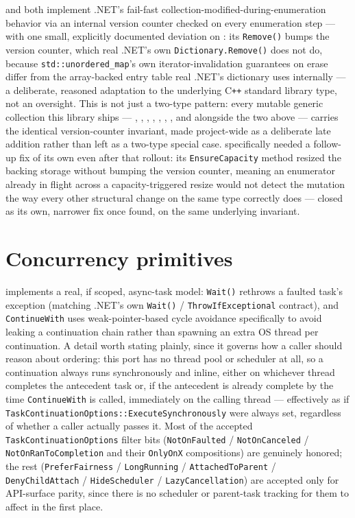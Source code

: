  and  both
implement .NET's fail-fast collection-modified-during-enumeration behavior via an internal
version counter checked on every enumeration step --- with one small, explicitly documented
deviation on : its \texttt{Remove()} bumps the version counter, which
real .NET's own \texttt{Dictionary.Remove()} does not do, because \texttt{std::unordered\_map}'s
own iterator-invalidation guarantees on erase differ from the array-backed entry table real
.NET's dictionary uses internally --- a deliberate, reasoned adaptation to the underlying
C\texttt{++} standard library type, not an oversight. This is not just a two-type pattern:
every mutable generic collection this library ships --- , ,
, , , ,
, and  alongside the two above --- carries the
identical version-counter invariant, made project-wide as a deliberate late addition rather
than left as a two-type special case.  specifically needed a
follow-up fix of its own even after that rollout: its \texttt{EnsureCapacity} method resized
the backing storage without bumping the version counter, meaning an enumerator already in
flight across a capacity-triggered resize would not detect the mutation the way every other
structural change on the same type correctly does --- closed as its own, narrower fix once
found, on the same underlying invariant.

\section{Concurrency primitives}

 implements a real, if scoped, async-task model:
\texttt{Wait()} rethrows a faulted task's exception (matching .NET's own
\texttt{Wait()} / \texttt{ThrowIfExceptional} contract), and \texttt{ContinueWith} uses
weak-pointer-based cycle avoidance specifically to avoid leaking a continuation chain rather
than spawning an extra OS thread per continuation. A detail worth stating plainly, since it
governs how a caller should reason about ordering: this port has no thread pool or scheduler
at all, so a continuation always runs synchronously and inline, either on whichever thread
completes the antecedent task or, if the antecedent is already complete by the time
\texttt{ContinueWith} is called, immediately on the calling thread --- effectively as if
\texttt{TaskContinuationOptions::ExecuteSynchronously} were always set, regardless of whether a
caller actually passes it. Most of the accepted \texttt{TaskContinuationOptions} filter bits
(\texttt{NotOnFaulted} / \texttt{NotOnCanceled} / \texttt{NotOnRanToCompletion} and their
\texttt{OnlyOnX} compositions) are genuinely honored; the rest
(\texttt{PreferFairness} / \texttt{LongRunning} / \texttt{AttachedToParent} /
\texttt{DenyChildAttach} / \texttt{HideScheduler} / \texttt{LazyCancellation}) are accepted only
for API-surface parity, since there is no scheduler or parent-task tracking for them to affect
in the first place.

